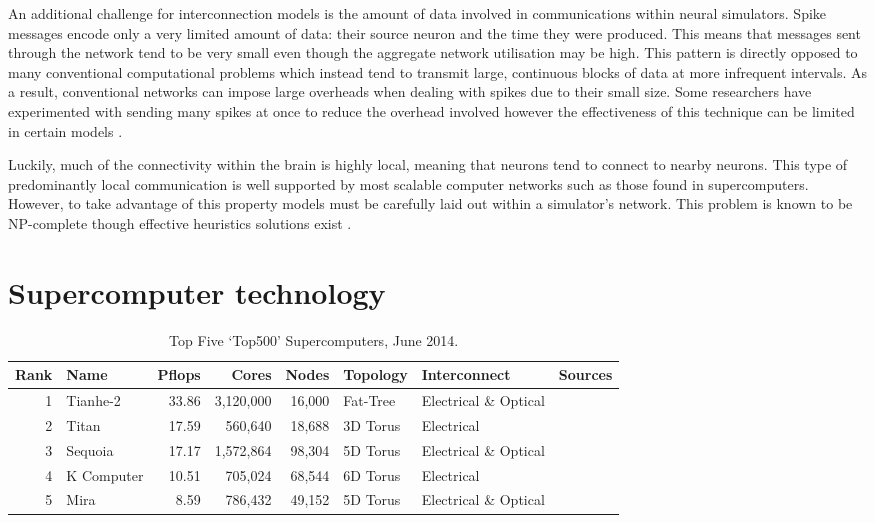 			An additional challenge for interconnection models is the amount of data
			involved in communications within neural simulators. Spike messages encode
			only a very limited amount of data: their source neuron and the time they
			were produced. This means that messages sent through the network tend to
			be very small even though the aggregate network utilisation may be high.
			This pattern is directly opposed to many conventional computational
			problems which instead tend to transmit large, continuous blocks of data
			at more infrequent intervals. As a result, conventional networks can
			impose large overheads when dealing with spikes due to their small size.
			Some researchers have experimented with sending many spikes at once to
			reduce the overhead involved however the effectiveness of this technique
			can be limited in certain models \cite{morrison05}.
			
			Luckily, much of the connectivity within the brain is highly local,
			meaning that neurons tend to connect to nearby neurons. This type of
			predominantly local communication is well supported by most scalable
			computer networks such as those found in supercomputers. However, to take
			advantage of this property models must be carefully laid out within a
			simulator's network. This problem is known to be NP-complete though
			effective heuristics solutions exist \cite{haldar00}.
		
		
	
	\section{Supercomputer technology}
		\label{sec:supercomputers}
		
		\begin{table}
			\center
			\begin{tabular}{r l r r r l l l}
				\toprule
				Rank & Name    & Pflops& Cores  & Nodes  & Topology & Interconnect          & Sources \\
				\midrule                          
				1 & Tianhe-2   & 33.86 & 3,120,000 & 16,000 & Fat-Tree & Electrical \& Optical & \cite{dongarra13} \\
				2 & Titan      & 17.59 & 560,640   & 18,688 & 3D Torus & Electrical            & \cite{bland12} \\
				3 & Sequoia    & 17.17 & 1,572,864 & 98,304 & 5D Torus & Electrical \& Optical & \cite{prickett10} \\
				4 & K Computer & 10.51 & 705,024   & 68,544 & 6D Torus & Electrical            & \cite{fujitsu11,yokokawa11} \\
				5 & Mira       &  8.59 & 786,432   & 49,152 & 5D Torus & Electrical \& Optical & \cite{prickett10} \\
				\bottomrule
			\end{tabular}
			
			\caption{Top Five `Top500' Supercomputers, June 2014.}
			\label{tab:top500}
		\end{table}
		
